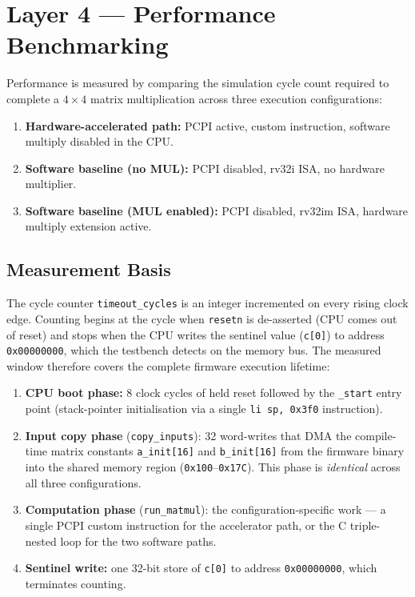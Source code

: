 ﻿\documentclass[12pt,a4paper]{report}
\begin{document}
\section{Layer 4 --- Performance Benchmarking}

Performance is measured by comparing the simulation cycle count required to complete a $4 \times 4$ matrix multiplication across three execution configurations:

\begin{enumerate}
    \item \textbf{Hardware-accelerated path:} PCPI active, custom instruction, software multiply disabled in the CPU.
    \item \textbf{Software baseline (no MUL):} PCPI disabled, rv32i ISA, no hardware multiplier.
    \item \textbf{Software baseline (MUL enabled):} PCPI disabled, rv32im ISA, hardware multiply extension active.
\end{enumerate}

\subsection{Measurement Basis}

The cycle counter \texttt{timeout\_cycles} is an integer incremented on every rising clock edge.
Counting begins at the cycle when \texttt{resetn} is de-asserted (CPU comes out of reset) and
stops when the CPU writes the sentinel value (\texttt{c[0]}) to address \texttt{0x00000000},
which the testbench detects on the memory bus.
The measured window therefore covers the complete firmware execution lifetime:

\begin{enumerate}
    \item \textbf{CPU boot phase:} 8 clock cycles of held reset followed by the \texttt{\_start} entry point (stack-pointer initialisation via a single \texttt{li sp, 0x3f0} instruction).
    \item \textbf{Input copy phase} (\texttt{copy\_inputs}): 32 word-writes that DMA the compile-time matrix constants \texttt{a\_init[16]} and \texttt{b\_init[16]} from the firmware binary into the shared memory region (\texttt{0x100}--\texttt{0x17C}). This phase is \emph{identical} across all three configurations.
    \item \textbf{Computation phase} (\texttt{run\_matmul}): the configuration-specific work --- a single PCPI custom instruction for the accelerator path, or the C triple-nested loop for the two software paths.
    \item \textbf{Sentinel write:} one 32-bit store of \texttt{c[0]} to address \texttt{0x00000000}, which terminates counting.
\end{enumerate}
\end{document}
